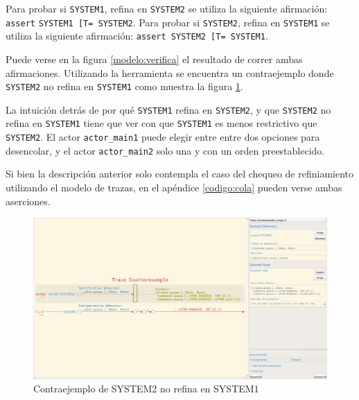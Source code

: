 Para probar si \verb$SYSTEM1$, refina en \verb$SYSTEM2$ se utiliza la siguiente afirmación: \verb$assert$ \verb$SYSTEM1 [T= SYSTEM2$. Para probar si \verb$SYSTEM2$, refina en \verb$SYSTEM1$ se utiliza la siguiente afirmación: \verb$assert SYSTEM2 [T= SYSTEM1$.

Puede verse en la figura \ref{modelo:verifica} el resultado de correr ambas afirmaciones. Utilizando la herramienta se encuentra un contraejemplo donde \verb$SYSTEM2$ no refina en \verb$SYSTEM1$ como muestra la figura \ref{modelo:contraejemplo}.

La intuición detrás de por qué \verb$SYSTEM1$ refina en \verb$SYSTEM2$, y que \verb$SYSTEM2$ no refina en \verb$SYSTEM1$ tiene que ver con que \verb$SYSTEM1$ es menos restrictivo que \verb$SYSTEM2$. El actor \verb=actor_main1= puede elegir entre entre dos opciones para desencolar, y el actor \verb=actor_main2= solo una y con un orden preestablecido.

Si bien la descripción anterior solo contempla el caso del chequeo de refiniamiento utilizando el modelo de trazas, en el apéndice \ref{codigo:cola} pueden verse ambas aserciones.

\begin{figure}
\begin{center}
\includegraphics[width=15 cm]{img/contraejemplo.png}
\caption{Contraejemplo de SYSTEM2 no refina en SYSTEM1}\label{modelo:contraejemplo}
\end{center}
\end{figure}
 

